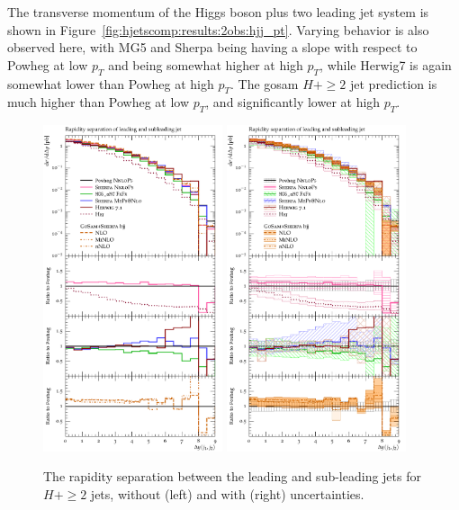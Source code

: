 The transverse momentum of the Higgs boson plus two leading jet system
is shown in Figure~\ref{fig:hjetscomp:results:2obs:hjj_pt}. Varying
behavior is also observed here, with MG5 and Sherpa being having a
slope with respect to Powheg at low $p_T$ and being somewhat higher at
high $p_T$, while Herwig7 is again somewhat lower than Powheg at high
$p_T$. The gosam $H+\ge2$ jet prediction is much higher than Powheg at
low $p_T$, and significantly lower at high $p_T$.


\begin{figure}[t!]
  \centering
  \includegraphics[width=0.47\textwidth]{figures/hjetscomp_u_deltay_jj.pdf}
  \hfill
  \includegraphics[width=0.47\textwidth]{figures/hjetscomp_deltay_jj.pdf}
  \caption{
    The rapidity separation between the leading and sub-leading jets
    for $H+\ge2$ jets, without (left) and with (right) uncertainties.
    \label{fig:hjetscomp:results:2obs:dyjj}
  }
\end{figure}

